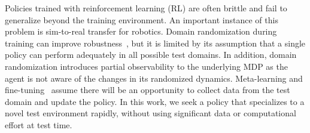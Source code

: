 \documentclass{article}
\newcommand{\TODO}[1]{\textcolor{red}{\textbf{TODO: #1}}}
\begin{document}
Policies trained with reinforcement learning (RL) are often brittle and fail to generalize beyond the training environment.
An important instance of this problem is sim-to-real transfer for robotics. %
Domain randomization during training can improve robustness~\citep{antonova-pivoting-corr17, zhu-RL-IL-diverse, baar2018simtoreal, sadeghi-cad2rl-rss17, tobin-domainrand-arxiv17},
but it is limited by its assumption that a single policy can perform adequately in all possible test domains.
In addition, domain randomization introduces partial observability to the underlying MDP as the agent is not aware of the changes in its randomized dynamics.
Meta-learning and fine-tuning~\citep{finn-maml-icml17, rusu-progressive-nets, duan-rl2}
assume there will be an opportunity
to collect data from the test domain and update the policy.
%
%
In this work, we seek a policy that specializes to a novel test environment rapidly,
without using significant data or computational effort at test time.
\end{document}
